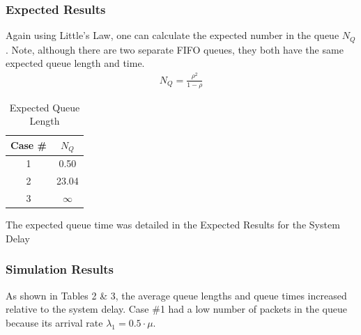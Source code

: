 \documentclass{article}
\begin{document}
\subsubsection{Expected Results}
Again using Little's Law, one can calculate the expected number in the queue $N_Q$.
Note, although there are two separate FIFO queues, they both have the same expected queue length and time.
\begin{align*}
N_Q = \frac{\rho^2}{1-\rho}
\end{align*}

\begin{table}[h!]
\centering
\begin{tabular}{|c|c|} \hline
\textbf{Case \#} & $N_Q$ \\ \hline
1 & 0.50  \\ \hline
2 & 23.04 \\ \hline
3 & $\infty$  \\ \hline 
\end{tabular}
\caption{Expected Queue Length}
\label{tab:expectQlen}
\end{table}

The expected queue time was detailed in the Expected Results for the System Delay
\subsubsection{Simulation Results}
As shown in Tables 2 \& 3, the average queue lengths and queue times increased relative to the system delay.  
Case \#1 had a low number of packets in the queue because its arrival rate $\lambda_1 = 0.5 \cdot \mu$.
\end{document}
